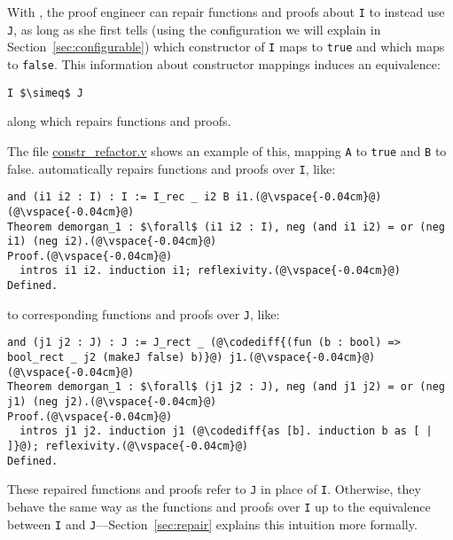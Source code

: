 With \toolname, the proof engineer can repair functions and proofs about \lstinline{I} to instead use \lstinline{J},
as long as she first tells \toolname (using the configuration we will explain in Section~\ref{sec:configurable}) which constructor of \lstinline{I} maps to \lstinline{true} and which maps to \lstinline{false}.
This information about constructor mappings induces an equivalence:

\begin{lstlisting}
I $\simeq$ J
\end{lstlisting}
along which \toolname repairs functions and proofs.

The file \href{https://github.com/uwplse/pumpkin-pi/blob/master/plugin/coq/playground/constr_refactor.v}{constr_refactor.v} shows an example
of this, mapping \lstinline{A} to \lstinline{true} and \lstinline{B} to false.
\toolname automatically repairs functions and proofs over \lstinline{I}, like:

\begin{lstlisting}
and (i1 i2 : I) : I := I_rec _ i2 B i1.(@\vspace{-0.04cm}@)
(@\vspace{-0.04cm}@)
Theorem demorgan_1 : $\forall$ (i1 i2 : I), neg (and i1 i2) = or (neg i1) (neg i2).(@\vspace{-0.04cm}@)
Proof.(@\vspace{-0.04cm}@)
  intros i1 i2. induction i1; reflexivity.(@\vspace{-0.04cm}@)
Defined.
\end{lstlisting}
to corresponding functions and proofs over \lstinline{J}, like:

\begin{lstlisting}[backgroundcolor=\color{cyan!30}]
and (j1 j2 : J) : J := J_rect _ (@\codediff{(fun (b : bool) => bool_rect _ j2 (makeJ false) b)}@) j1.(@\vspace{-0.04cm}@)
(@\vspace{-0.04cm}@)
Theorem demorgan_1 : $\forall$ (j1 j2 : J), neg (and j1 j2) = or (neg j1) (neg j2).(@\vspace{-0.04cm}@)
Proof.(@\vspace{-0.04cm}@)
  intros j1 j2. induction j1 (@\codediff{as [b]. induction b as [ | ]}@); reflexivity.(@\vspace{-0.04cm}@)
Defined.
\end{lstlisting}
These repaired functions and proofs refer to \lstinline{J} in place of \lstinline{I}.
Otherwise, they behave the same way as the functions and proofs over \lstinline{I} up to the equivalence between
\lstinline{I} and \lstinline{J}---Section~\ref{sec:repair} explains this intuition more formally.

